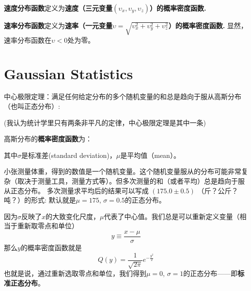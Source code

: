 \documentclass[CJK]{beamer}
\begin{document}
\begin{frame}
\bch
    {\bf 速度分布函数}定义为{\bf 速度（三元变量$(\upsilon_x, \upsilon_y,\upsilon_z)$）的概率密度函数.}

    \skiplines
    
{\bf 速率分布函数}定义为{\bf 速率（一元变量$\upsilon = \sqrt{\upsilon_x^2+\upsilon_y^2+\upsilon_z^2}$）的概率密度函数.} 显然，速率分布函数在$\upsilon<0$处为零。
    
\ech
\end{frame}


\section{Gaussian Statistics}



\begin{frame}
\bch
    {\blue 中心极限定理：满足任何给定分布的多个随机变量的和总是趋向于服从高斯分布（也叫正态分布）:}

    (我认为统计学里只有两条非平凡的定律，中心极限定理是其中一条)

    \skiplines
    
   高斯分布的{\bf 概率密度函数}为：

   其中{\blue $\sigma$是标准差(standard deviation)，$\mu$是平均值（mean）}。


\ech
\end{frame}




\begin{frame}
\end{frame}

\begin{frame}
\bch
\bex
小张测量体重，得到的数值是一个随机变量。这个随机变量服从的分布可能非常复杂（取决于测量工具，测量方式等）。但多次测量的和（或者平均）总是趋向于服从正态分布。
多次测量求平均后的结果可以写成 $(175.0\pm0.5)$ （斤？公斤？吨？）的形式: 默认就是$\mu = 175$, $\sigma = 0.5$的正态分布。
\eex
\ech
\end{frame}


\begin{frame}
\bch
因为$\sigma$反映了$x$的大致变化尺度，$\mu$代表了中心值。我们总是可以重新定义变量（相当于重新取零点和单位）
$$y \equiv \frac{x-\mu}{\sigma}$$
那么$y$的概率密度函数就是
$$Q(y) =  \frac{1}{\sqrt{2\pi}} e^{-\frac{y^2}{2}}  $$
也就是说，通过重新选取零点和单位，我们得到$\mu=0$, $\sigma=1$的正态分布——即{\bf 标准正态分布}。
\ech
\end{frame}
\end{document}
